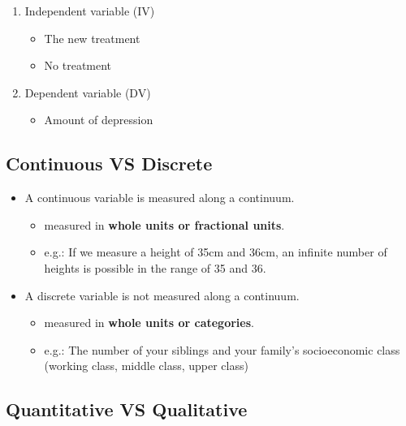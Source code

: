 \documentclass[]{article}
\providecommand{\tightlist}{%
  \setlength{\itemsep}{0pt}\setlength{\parskip}{0pt}}
\begin{document}
\begin{enumerate}
\def\labelenumi{\arabic{enumi}.}
\tightlist
\item
  Independent variable (IV)

  \begin{itemize}
  \tightlist
  \item
    The new treatment
  \item
    No treatment
  \end{itemize}
\item
  Dependent variable (DV)

  \begin{itemize}
  \tightlist
  \item
    Amount of depression
  \end{itemize}
\end{enumerate}

\hypertarget{continuous-vs-discrete}{%
\subsection{Continuous VS Discrete}\label{continuous-vs-discrete}}

\begin{itemize}
\tightlist
\item
  A continuous variable is measured along a continuum.

  \begin{itemize}
  \tightlist
  \item
    measured in {\textbf{whole units or fractional units}}.
  \item
    e.g.: If we measure a height of 35cm and 36cm, an infinite number of
    heights is possible in the range of 35 and 36.
  \end{itemize}
\item
  A discrete variable is not measured along a continuum.

  \begin{itemize}
  \tightlist
  \item
    measured in {\textbf{whole units or categories}}.
  \item
    e.g.: The number of your siblings and your family's socioeconomic
    class (working class, middle class, upper class)
  \end{itemize}
\end{itemize}

\hypertarget{quantitative-vs-qualitative}{%
\subsection{Quantitative VS
Qualitative}\label{quantitative-vs-qualitative}}
\end{document}
